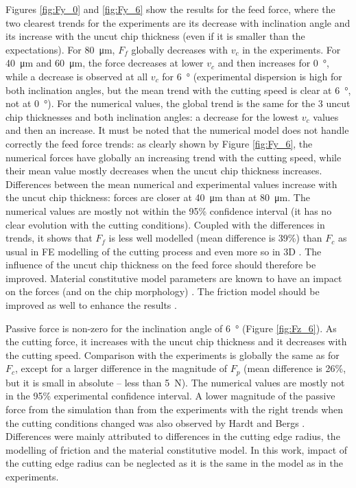 \documentclass[preprint,12pt,times]{elsarticle}
\begin{document}
Figures \ref{fig:Fy_0} and \ref{fig:Fy_6} show the results for the feed force, where the two clearest trends for the experiments are its decrease with inclination angle and its increase with the uncut chip thickness (even if it is smaller than the expectations). For \qty{80}{\um}, $F_f$ globally decreases with $v_c$ in the experiments. For \qty{40}{\um} and \qty{60}{\um}, the force decreases at lower $v_c$ and then increases for \qty{0}{\degree}, while a decrease is observed at all $v_c$ for \qty{6}{\degree} (experimental dispersion is high for both inclination angles, but the mean trend with the cutting speed is clear at \qty{6}{\degree}, not at \qty{0}{\degree}). For the numerical values, the global trend is the same for the 3 uncut chip thicknesses and both inclination angles: a decrease for the lowest $v_c$ values and then an increase. It must be noted that the numerical model does not handle correctly the feed force trends: as clearly shown by Figure \ref{fig:Fy_6}, the numerical forces have globally an increasing trend with the cutting speed, while their mean value mostly decreases when the uncut chip thickness increases. Differences between the mean numerical and experimental values increase with the uncut chip thickness: forces are closer at \qty{40}{\um} than at \qty{80}{\um}. The numerical values are mostly not within the 95\% confidence interval (it has no clear evolution with the cutting conditions). Coupled with the differences in trends, it shows that $F_f$ is less well modelled (mean difference is 39\%) than $F_c$ as usual in FE modelling of the cutting process and even more so in 3D \cite{hardt_Three_2021}. The influence of the uncut chip thickness on the feed force should therefore be improved. Material constitutive model parameters are known to have an impact on the forces (and on the chip morphology) \cite{ducobu_Importance_2017,kugalurpalanisamy_Identification_2022}. The friction model should be improved as well to enhance the results \cite{hardt_Three_2021}.

Passive force is non-zero for the inclination angle of \qty{6}{\degree} (Figure \ref{fig:Fz_6}). As the cutting force, it increases with the uncut chip thickness and it decreases with the cutting speed. Comparison with the experiments is globally the same as for $F_c$, except for a larger difference in the magnitude of $F_p$ (mean difference is 26\%, but it is small in absolute – less than \qty{5}{N}). The numerical values are mostly not in the 95\% experimental confidence interval. A lower magnitude of the passive force from the simulation than from the experiments with the right trends when the cutting conditions changed was also observed by Hardt and Bergs \cite{hardt_Three_2021}. Differences were mainly attributed to differences in the cutting edge radius, the modelling of friction and the material constitutive model. In this work, impact of the cutting edge radius can be neglected as it is the same in the model as in the experiments.
\end{document}
